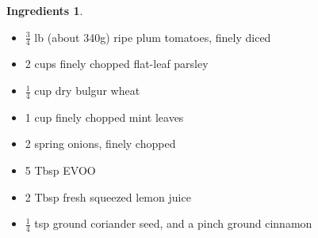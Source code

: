 \documentclass[a4paper,12pt]{scrreprt}
\theoremstyle{definition}
\newtheorem*{ingredients}{Ingredients}
\theoremstyle{plain}
\theoremstyle{remark}
\begin{document}
\begin{ingredients}
  $\,$
  \begin{multicols}{2}
    \begin{itemize}
      \item $\frac{3}{4}$ lb (about 340g) ripe plum tomatoes, finely diced

      \item 2 cups finely chopped flat-leaf parsley

      \item $\frac{1}{4}$ cup dry bulgur wheat

      \item 1 cup finely chopped mint leaves

      \item 2 spring onions, finely chopped

      \item 5 Tbsp EVOO

      \item 2 Tbsp fresh squeezed lemon juice

      \item $\frac{1}{4}$ tsp ground coriander seed, and a pinch ground cinnamon
    \end{itemize}
  \end{multicols}
\end{ingredients}
\end{document}
